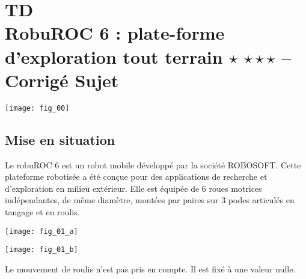 
\chapter*{TD  \\ 
RobuROC 6 : plate-forme d’exploration tout terrain 
\ifnormal $\star$ \else \fi \iftdifficile $\star\star\star$ \else \fi 
 -- \ifprof Corrigé \else Sujet \fi}

\iflivret {} \else
\ifprof  {} \else \fi
\fi

\setcounter{question}{0}


\begin{marginfigure} [2cm]
\texttt{[image: fig\_00]}
\end{marginfigure}




\section*{Mise en situation}
\ifprof
\else

Le robuROC 6 est un robot mobile développé par la société ROBOSOFT. Cette plateforme
robotisée a été conçue pour des applications de recherche et d’exploration en milieu extérieur. Elle est
équipée de 6 roues motrices indépendantes, de même diamètre, montées par paires sur 3 podes articulés en
tangage et en roulis.

\begin{marginfigure}[3cm]
\texttt{[image: fig\_01\_a]}
\end{marginfigure}


\begin{marginfigure}[7cm]
\texttt{[image: fig\_01\_b]}
\end{marginfigure}

\begin{hypo}
Le mouvement de roulis n’est pas pris en compte. Il est fixé à une valeur nulle.
\end{hypo}

